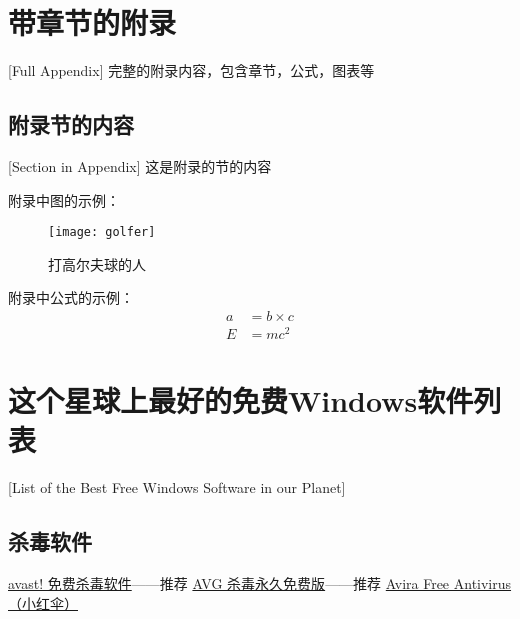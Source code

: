 \chapter{带章节的附录}[Full Appendix]%
完整的附录内容，包含章节，公式，图表等

\section{附录节的内容}[Section in Appendix]
这是附录的节的内容

附录中图的示例：
\begin{figure}[htbp]
\centering
\texttt{[image: golfer]}
\caption{\xiaosi[0]打高尔夫球的人}
\end{figure}

附录中公式的示例：
\begin{align}
a & = b \times c \\
E & = m c^2
\label{eq}
\end{align}

\chapter{这个星球上最好的免费Windows软件列表}[List of the Best Free Windows Software in our Planet]
\section*{杀毒软件}
\href{http://www.avast.com/zh-cn/free-antivirus-download}{avast! 免费杀毒软件}——推荐
\href{http://www.avg.com/cn-zh/china-avg-antivirus-free}{AVG 杀毒永久免费版}——推荐
\href{http://www.avira.com/en/avira-free-antivirus}{Avira Free Antivirus （小红伞）}
